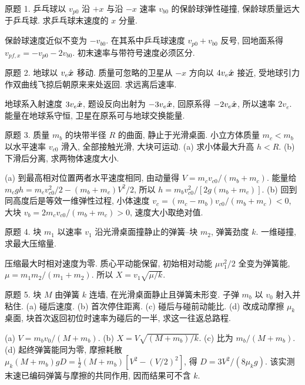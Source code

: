\begin{exercise}
原题 1. 乒乓球以 $v_{p0}$ 沿 $+x$ 与沿 $-x$ 速率 $v_{b0}$ 的保龄球弹性碰撞, 保龄球质量远大于乒乓球. 求乒乓球末速度的 $x$ 分量.
\end{exercise}
\begin{solution}
保龄球速度近似不变为 $-v_{b0}$. 在其系中乒乓球速度 $v_{p0}+v_{b0}$ 反号, 回地面系得 $v_{pf,x}=-v_{p0}-2v_{b0}$. 初末速率与带符号速度必须区分.
\end{solution}
\begin{exercise}
原题 2. 地球以 $v_e\hat{\boldsymbol{x}}$ 移动. 质量可忽略的卫星从 $-x$ 方向以 $4v_e\hat{\boldsymbol{x}}$ 接近, 受地球引力作双曲线飞掠后朝原来来处返回. 求远离后速率.
\end{exercise}
\begin{solution}
地球系入射速度 $3v_e\hat{\boldsymbol{x}}$, 题设反向出射为 $-3v_e\hat{\boldsymbol{x}}$, 回原系得 $-2v_e\hat{\boldsymbol{x}}$, 所以速率 $2v_e$. 能量在地球系守恒, 卫星在原系可与地球交换能量.
\end{solution}
\begin{exercise}
原题 3. 质量 $m_b$ 的块带半径 $R$ 的曲面, 静止于光滑桌面. 小立方体质量 $m_c<m_b$ 以水平速率 $v_{c0}$ 滑入, 全部接触光滑, 大块可运动. (a) 求小体最大升高 $h<R$. (b) 下滑后分离, 求两物体速度大小.
\end{exercise}
\begin{solution}
(a) 到最高相对位置两者水平速度相同, 由动量得 $V=m_cv_{c0}/(m_b+m_c)$. 能量给 $m_cgh=m_cv_{c0}^2/2-(m_b+m_c)V^2/2$, 所以 $h=m_bv_{c0}^2/[2g(m_b+m_c)]$. (b) 回到同高度后是等效一维弹性过程, 小体速度 $v_c=(m_c-m_b)v_{c0}/(m_b+m_c)<0$, 大块 $v_b=2m_cv_{c0}/(m_b+m_c)>0$, 速度大小取绝对值.
\end{solution}
\begin{exercise}
原题 4. 块 $m_1$ 以速率 $v_1$ 沿光滑桌面撞静止的弹簧--块 $m_2$, 弹簧劲度 $k$. 一维碰撞, 求最大压缩量.
\end{exercise}
\begin{solution}
压缩最大时相对速度为零. 质心平动能保留, 初始相对动能 $\mu v_1^2/2$ 全变为弹簧能, $\mu=m_1m_2/(m_1+m_2)$. 所以 $X=v_1\sqrt{\mu/k}$.
\end{solution}
\begin{exercise}
原题 5. 块 $M$ 由弹簧 $k$ 连墙, 在光滑桌面静止且弹簧未形变. 子弹 $m_b$ 以 $v_0$ 射入并粘住. (a) 碰后速度. (b) 首次停住距离. (c) 碰后与碰前动能比. (d) 改成动摩擦 $\mu_k$ 桌面, 块首次返回初位时速率为碰后的一半, 求这一往返总路程.
\end{exercise}
\begin{solution}
(a) $V=m_bv_0/(M+m_b)$. (b) $X=V\sqrt{(M+m_b)/k}$. (c) 比为 $m_b/(M+m_b)$. (d) 起终弹簧能同为零, 摩擦耗散 $\mu_k(M+m_b)gD=\frac12(M+m_b)[V^2-(V/2)^2]$, 得 $D=3V^2/(8\mu_kg)$. 该实测末速已编码弹簧与摩擦的共同作用, 因而结果可不含 $k$.
\end{solution}
